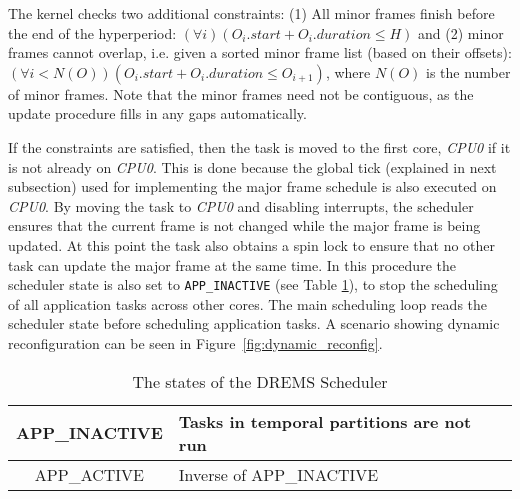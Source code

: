 %

The kernel checks two additional constraints: (1) All minor frames
finish before the end of the hyperperiod: $(\forall i)(O_{i}.start+O_{i}.duration
\leq H)$ and (2) minor frames cannot overlap, i.e. given a sorted minor
frame list (based on their offsets): $(\forall i <
N(O))(O_{i}.start+O_{i}.duration \leq O_{i+1})$, where $N(O)$ is the number
of minor frames.   Note that the minor frames need not be contiguous,
as the update procedure fills in any gaps automatically.

If the constraints are satisfied, then the task is moved to the first core, \emph{CPU0} if it is not already on \emph{CPU0}. 
This is done because the global tick (explained in next subsection) used for implementing the major 
frame schedule is also executed on \emph{CPU0}. By moving the task to \emph{CPU0} and disabling interrupts, 
the scheduler ensures that the current frame is not changed while the major frame is being updated. 
At this point the task also obtains a spin lock to  ensure that no other task can update the major frame at 
the same time. In this procedure the scheduler state is also set to \texttt{APP\_INACTIVE} (see Table \ref{table:variable}), to stop the scheduling of all application
tasks across other cores. The main scheduling loop reads the scheduler state before scheduling application tasks. A  scenario showing dynamic reconfiguration can be seen in Figure~\ref{fig:dynamic_reconfig}. 

\begin{table}[ht]
\centering
\caption{The states of the DREMS Scheduler}
\footnotesize
\begin{tabular}{| c | p{} |}
\hline
 APP\_INACTIVE &Tasks in temporal partitions are not run \\\hline
 APP\_ACTIVE &Inverse of APP\_INACTIVE\\\hline
\end{tabular}
\label{table:variable}
\end{table}

